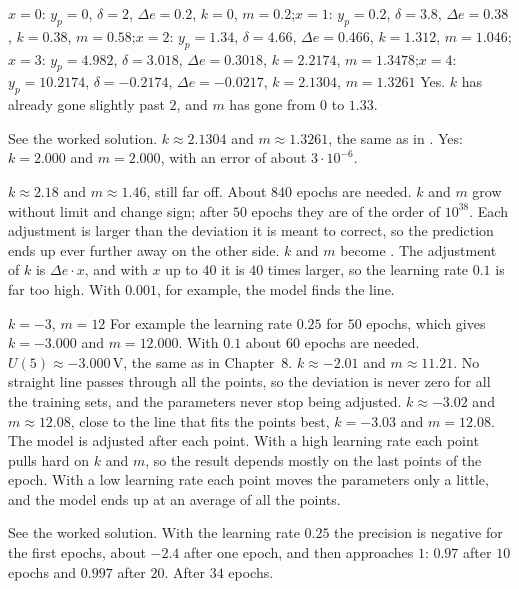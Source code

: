 \begin{facit}
  $x = 0$: $y_p = 0$, $\delta = 2$, $\Delta e = 0.2$, $k = 0$,
$m = 0.2$;\enspace $x = 1$: $y_p = 0.2$, $\delta = 3.8$, $\Delta e = 0.38$, $k = 0.38$,
$m = 0.58$;\enspace $x = 2$: $y_p = 1.34$, $\delta = 4.66$, $\Delta e = 0.466$, $k = 1.312$,
$m = 1.046$;\enspace $x = 3$: $y_p = 4.982$, $\delta = 3.018$, $\Delta e = 0.3018$,
$k = 2.2174$, $m = 1.3478$;\enspace $x = 4$: $y_p = 10.2174$, $\delta = -0.2174$,
$\Delta e = -0.0217$, $k = 2.1304$, $m = 1.3261$
 Yes. $k$ has already gone slightly past $2$, and $m$ has gone from $0$ to $1.33$.

  See the worked solution.  $k \approx 2.1304$ and $m \approx 1.3261$, the
same as in .  Yes: $k = 2.000$ and $m = 2.000$, with an error of about
$3 \cdot 10^{-6}$.

  $k \approx 2.18$ and $m \approx 1.46$, still far off. About $840$ epochs are
needed.
 $k$ and $m$ grow without limit and change sign; after $50$ epochs they are of the order of
$10^{38}$. Each adjustment is larger than the deviation it is meant to correct, so the prediction
ends up ever further away on the other side.
 $k$ and $m$ become . The adjustment of $k$ is $\Delta e \cdot x$, and with $x$ up
to $40$ it is $40$ times larger, so the learning rate $0.1$ is far too high. With $0.001$, for
example, the model finds the line.

  $k = -3$, $m = 12$
 For example the learning rate $0.25$ for $50$ epochs, which gives $k = -3.000$ and
$m = 12.000$. With $0.1$ about $60$ epochs are needed.
 $U(5) \approx -3.000\,\text{V}$, the same as in Chapter~8.
 $k \approx -2.01$ and $m \approx 11.21$. No straight line passes through all the points, so
the deviation is never zero for all the training sets, and the parameters never stop being
adjusted.
 $k \approx -3.02$ and $m \approx 12.08$, close to the line that fits the points best,
$k = -3.03$ and $m = 12.08$. The model is adjusted after each point. With a high learning rate
each point pulls hard on $k$ and $m$, so the result depends mostly on the last points of the
epoch. With a low learning rate each point moves the parameters only a little, and the model
ends up at an average of all the points.

  See the worked solution.
 With the learning rate $0.25$ the precision is negative for the first epochs, about $-2.4$
after one epoch, and then approaches $1$: $0.97$ after $10$ epochs and $0.997$ after $20$.
 After $34$ epochs.


\end{facit}
